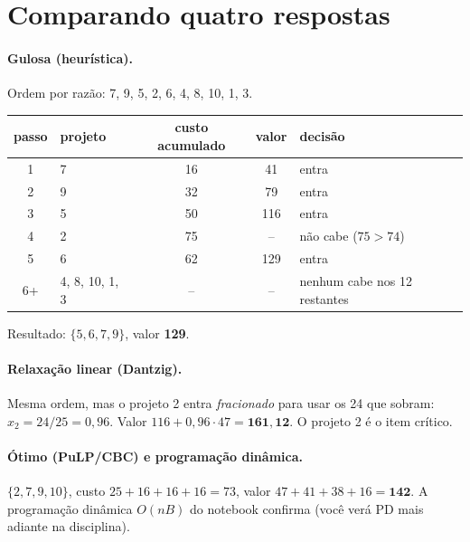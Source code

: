 \section{Comparando quatro respostas}

\paragraph{Gulosa (heurística).} Ordem por razão: 7, 9, 5, 2, 6, 4, 8, 10, 1, 3.
\begin{center}
\begin{tabular}{clccl}
\toprule
passo & projeto & custo acumulado & valor & decisão\\
\midrule
1 & 7 & 16 & 41 & entra\\
2 & 9 & 32 & 79 & entra\\
3 & 5 & 50 & 116 & entra\\
4 & 2 & 75 & -- & não cabe ($75>74$)\\
5 & 6 & 62 & 129 & entra\\
6+ & 4, 8, 10, 1, 3 & -- & -- & nenhum cabe nos 12 restantes\\
\bottomrule
\end{tabular}
\end{center}
Resultado: $\{5,6,7,9\}$, valor \textbf{129}.

\paragraph{Relaxação linear (Dantzig).} Mesma ordem, mas o projeto 2 entra \emph{fracionado} para usar os 24 que
sobram: $x_2=24/25=0{,}96$. Valor $116+0{,}96\cdot47=\mathbf{161{,}12}$. O projeto 2 é o item crítico.

\paragraph{Ótimo (PuLP/CBC) e programação dinâmica.} $\{2,7,9,10\}$, custo $25+16+16+16=73$, valor
$47+41+38+16=\mathbf{142}$. A programação dinâmica $O(nB)$ do notebook confirma (você verá PD mais adiante na
disciplina).

\begin{center}
\end{center}

